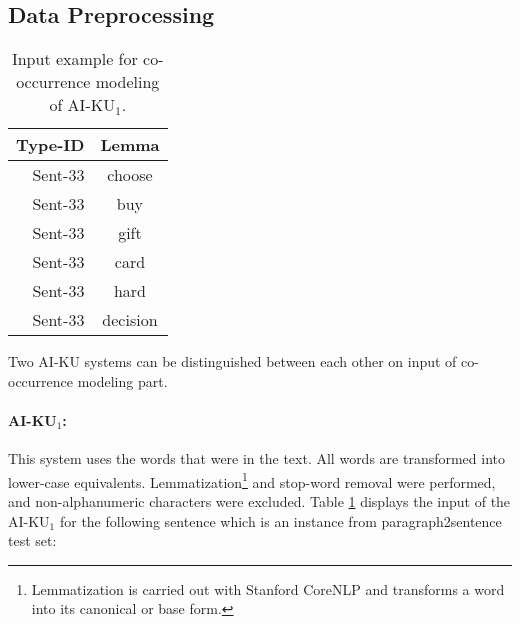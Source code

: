 \documentclass[11pt]{article}
\begin{document}
\subsection{Data Preprocessing}


\begin{table}
\begin{center}
\begin{tabular}{|r|c|}
\hline \bf Type-ID & \bf Lemma \\ \hline
Sent-33 & choose \\
Sent-33 & buy \\
Sent-33 & gift \\
Sent-33 & card \\
Sent-33 & hard \\
Sent-33 & decision \\
\hline
\end{tabular}
\end{center}
\caption{\label{tab:system1_input} Input example for co-occurrence modeling of AI-KU$_1$.}
\end{table}


\begin{table*}[htbp]
\caption{Contexts when using a bigram language model}
\label{tab:subs_exp}
\end{table*}



Two AI-KU systems can be distinguished between each other on input of co-occurrence modeling part. 

\paragraph{AI-KU$_1$:} This system uses the words that were in the text. All words are transformed into lower-case equivalents. Lemmatization\footnote{Lemmatization is carried out with Stanford CoreNLP and transforms a word into its canonical or base form.} and stop-word removal were performed, and non-alphanumeric characters were excluded. Table \ref{tab:system1_input} displays the input of the AI-KU$_1$ for the following sentence which is an instance from paragraph2sentence test set:
\end{document}
